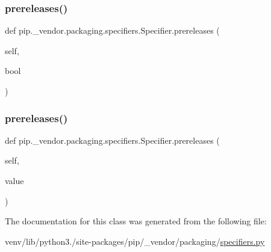 \subsubsection{\texorpdfstring{prereleases()}{prereleases()}\hspace{0.1cm}{\footnotesize\ttfamily [1/2]}}
{\footnotesize\ttfamily def pip.\+\_\+vendor.\+packaging.\+specifiers.\+Specifier.\+prereleases (\begin{DoxyParamCaption}\item[{}]{self,  }\item[{}]{bool }\end{DoxyParamCaption})}

\mbox{\label{classpip_1_1__vendor_1_1packaging_1_1specifiers_1_1Specifier_a7ff6f5b265f60fe0942a4a3dd50e43ad}} 
\subsubsection{\texorpdfstring{prereleases()}{prereleases()}\hspace{0.1cm}{\footnotesize\ttfamily [2/2]}}
{\footnotesize\ttfamily def pip.\+\_\+vendor.\+packaging.\+specifiers.\+Specifier.\+prereleases (\begin{DoxyParamCaption}\item[{}]{self,  }\item[{}]{value }\end{DoxyParamCaption})}



The documentation for this class was generated from the following file\+:\begin{DoxyCompactItemize}
\item 
venv/lib/python3./site-\/packages/pip/\+\_\+vendor/packaging/\hyperlink{pip_2__vendor_2packaging_2specifiers_8py}{specifiers.\+py}\end{DoxyCompactItemize}
